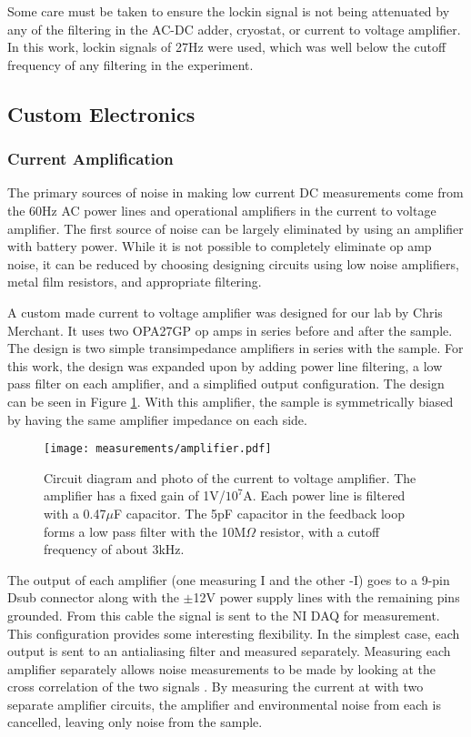 Some care must be taken to ensure the lockin signal is not being attenuated by any of the filtering in the AC-DC adder, cryostat, or current to voltage amplifier.  In this work, lockin signals of 27Hz were used, which was well below the cutoff frequency of any filtering in the experiment.

\subsection{Custom Electronics}

\subsubsection*{Current Amplification}
\label{sec:CV_amp}

The primary sources of noise in making low current DC measurements come from the 60Hz AC power lines and operational amplifiers in the current to voltage amplifier. The first source of noise can be largely eliminated by using an amplifier with battery power. While it is not possible to completely eliminate op amp noise, it can be reduced by choosing designing circuits using low noise amplifiers, metal film resistors, and appropriate filtering. 

A custom made current to voltage amplifier was designed for our lab by Chris Merchant. It uses two OPA27GP op amps in series before and after the sample. The design is two simple transimpedance amplifiers in series with the sample. For this work, the design was expanded upon by adding power line filtering, a low pass filter on each amplifier, and a simplified output configuration. The design can be seen in Figure \ref{fig:current_amp}. With this amplifier, the sample is symmetrically biased by having the same amplifier impedance on each side.

\begin{figure}
    \centering
    \texttt{[image: measurements/amplifier.pdf]}
    \caption{Circuit diagram and photo of the current to voltage amplifier. The amplifier has a fixed gain of 1V/$10^7$A. Each power line is filtered with a 0.47$\mu$F capacitor. The 5pF capacitor in the feedback loop forms a low pass filter with the 10M$\Omega$ resistor, with a cutoff frequency of about 3kHz.}
    \label{fig:current_amp}
\end{figure}

The output of each amplifier (one measuring I and the other -I) goes to a 9-pin Dsub connector along with the $\pm$12V power supply lines with the remaining pins grounded. From this cable the signal is sent to the NI DAQ for measurement. This configuration provides some interesting flexibility. In the simplest case, each output is sent to an antialiasing filter and measured separately. Measuring each amplifier separately allows noise measurements to be made by looking at the cross correlation of the two signals \cite{Merchant2009}. By measuring the current at with two separate amplifier circuits, the amplifier and environmental noise from each is cancelled, leaving only noise from the sample.

